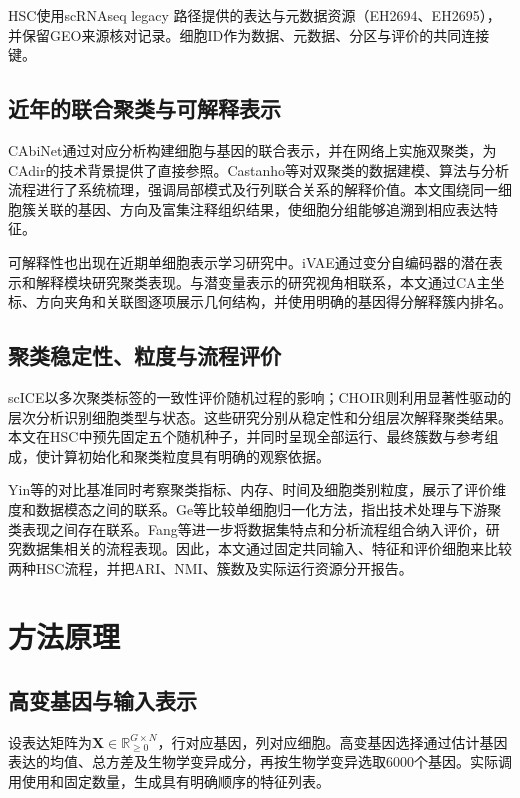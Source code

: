 HSC使用scRNAseq legacy \texttt{\fontsize{10}{12}\selectfont{}}路径提供的表达与元数据资源（EH2694、EH2695），并保留GEO来源核对记录。细胞ID作为数据、元数据、分区与评价的共同连接键。

\subsection{近年的联合聚类与可解释表示}
CAbiNet通过对应分析构建细胞与基因的联合表示，并在网络上实施双聚类，为CAdir的技术背景提供了直接参照\cite{zhao2024cabinet}。Castanho等对双聚类的数据建模、算法与分析流程进行了系统梳理，强调局部模式及行列联合关系的解释价值\cite{castanho2024}。本文围绕同一细胞簇关联的基因、方向及富集注释组织结果，使细胞分组能够追溯到相应表达特征。

可解释性也出现在近期单细胞表示学习研究中。iVAE通过变分自编码器的潜在表示和解释模块研究聚类表现\cite{fu2025ivae}。与潜变量表示的研究视角相联系，本文通过CA主坐标、方向夹角和关联图逐项展示几何结构，并使用明确的基因得分解释簇内排名。

\subsection{聚类稳定性、粒度与流程评价}
scICE以多次聚类标签的一致性评价随机过程的影响\cite{kim2025scice}；CHOIR则利用显著性驱动的层次分析识别细胞类型与状态\cite{sant2025choir}。这些研究分别从稳定性和分组层次解释聚类结果。本文在HSC中预先固定五个随机种子，并同时呈现全部运行、最终簇数与参考组成，使计算初始化和聚类粒度具有明确的观察依据。

Yin等的对比基准同时考察聚类指标、内存、时间及细胞类别粒度，展示了评价维度和数据模态之间的联系\cite{yin2025benchmark}。Ge等比较单细胞归一化方法，指出技术处理与下游聚类表现之间存在联系\cite{ge2025normalization}。Fang等进一步将数据集特点和分析流程组合纳入评价，研究数据集相关的流程表现\cite{fang2024pipeline}。因此，本文通过固定共同输入、特征和评价细胞来比较两种HSC流程，并把ARI、NMI、簇数及实际运行资源分开报告。

\section{方法原理}
\subsection{高变基因与输入表示}
设表达矩阵为$\mathbf{X}\in\mathbb{R}_{\geq0}^{G\times N}$，行对应基因，列对应细胞。高变基因选择通过\texttt{\fontsize{10}{12}\selectfont{}}估计基因表达的均值、总方差及生物学变异成分，再按生物学变异选取\allowbreak{}6000个基因。实际调用使用\texttt{\fontsize{10}{12}\selectfont{}}和固定数量，生成具有明确顺序的特征列表。

